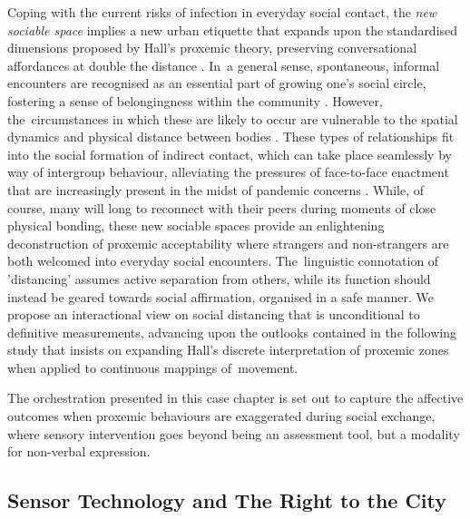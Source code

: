 Coping with the current risks of infection in everyday social contact, the \textit{new sociable space} implies a new urban etiquette that expands upon the standardised dimensions proposed by Hall's proxemic theory, preserving conversational affordances at double the distance \citep{mehta_new_2020}. In~a general sense, spontaneous, informal encounters are recognised as an essential part of growing one's social circle, fostering a sense of belongingness within the community \citep{ye_ambivalence_2016}. However, the~circumstances in which these are likely to occur are vulnerable to the spatial dynamics and physical distance between bodies \citep{van_den_berg_subjective_2017, fayard_photocopiers_2007}. These types of relationships fit into the social formation of indirect contact, which can take place seamlessly by way of intergroup behaviour, alleviating the pressures of face-to-face enactment \citep{white_beyond_2021} that are increasingly present in the midst of pandemic concerns \citep{durnova_intimacy_2021}. While, of course, many will long to reconnect with their peers during moments of close physical bonding, these new sociable spaces provide an enlightening deconstruction of proxemic acceptability where strangers and non-strangers are both welcomed into everyday social encounters. The~linguistic connotation of 'distancing' assumes active separation from others, while its function should instead be geared towards social affirmation, organised in a safe manner. We propose an interactional view on social distancing that is unconditional to definitive measurements, advancing upon the outlooks contained in the following study \citep{ballendat_proxemic_2010} that insists on expanding Hall's discrete interpretation of proxemic zones when applied to continuous mappings of~movement.

The orchestration presented in this case chapter is set out to capture the affective outcomes when proxemic behaviours are exaggerated during social exchange, where sensory intervention goes beyond being an assessment tool, but a modality for non-verbal expression.

\subsection*{Sensor Technology and The Right to the City}
\label{subsec:shift}


